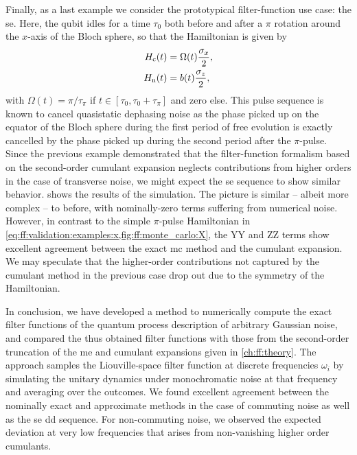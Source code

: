 Finally, as a last example we consider the prototypical filter-function use case: the \acrfull{se}.
Here, the qubit idles for a time $\tau_{0}$ both before and after a $\pi$ rotation around the $x$-axis of the Bloch sphere, so that the Hamiltonian is given by
\begin{equation}\label{eq:ff:validation:examples:se}
    \begin{split}
        H_{\mathrm{c}}(t) &= \Omega(t)\frac{\sigma_x}{2}, \\
        H_{\mathrm{n}}(t) &= b(t)\frac{\sigma_z}{2},
    \end{split}
\end{equation}
with $\Omega(t) = \pi/\tau_\pi$ if $t\in[\tau_0, \tau_0+\tau_\pi]$ and zero else.
This pulse sequence is known to cancel quasistatic dephasing noise as the phase picked up on the equator of the Bloch sphere during the first period of free evolution is exactly cancelled by the phase picked up during the second period after the $\pi$-pulse.
Since the previous example demonstrated that the filter-function formalism based on the second-order cumulant expansion neglects contributions from higher orders in the case of transverse noise, we might expect the \gls{se} sequence to show similar behavior.
 shows the results of the simulation.
The picture is similar -- albeit more complex -- to before, with nominally-zero terms suffering from numerical noise.
However, in contrast to the simple $\pi$-pulse Hamiltonian in \cref{eq:ff:validation:examples:x,fig:ff:monte_carlo:X}, the YY and ZZ terms show excellent agreement between the exact \gls{mc} method and the cumulant expansion.
We may speculate that the higher-order contributions not captured by the cumulant method in the previous case drop out due to the symmetry of the Hamiltonian.

In conclusion, we have developed a method to numerically compute the exact filter functions of the quantum process description of arbitrary Gaussian noise, and compared the thus obtained filter functions with those from the second-order truncation of the \gls{me} and cumulant expansions given in \cref{ch:ff:theory}.
The approach samples the Liouville-space filter function at discrete frequencies $\omega_i$ by simulating the unitary dynamics under monochromatic noise at that frequency and averaging over the outcomes.
We found excellent agreement between the nominally exact and approximate methods in the case of commuting noise as well as the \gls{se} \gls{dd} sequence.
For non-commuting noise, we observed the expected deviation at very low frequencies that arises from non\hyp{}vanishing higher order cumulants.


